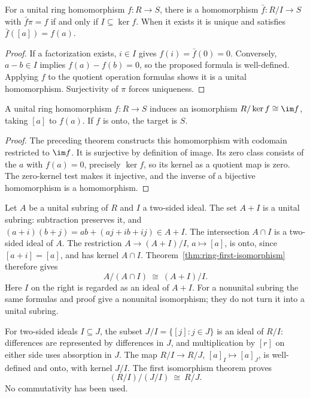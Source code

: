 \begin{theorem}\label{thm:ring-quotient-universal}
For a unital ring homomorphism $f:R\to S$, there is a homomorphism
$\bar f:R/I\to S$ with $\bar f\pi=f$ if and only if $I\subseteq\ker f$.
When it exists it is unique and satisfies $\bar f([a])=f(a)$.
\end{theorem}
\begin{proof}
If a factorization exists, $i\in I$ gives $f(i)=\bar f(0)=0$.
Conversely, $a-b\in I$ implies $f(a)-f(b)=0$, so the proposed formula
is well-defined. Applying $f$ to the quotient operation formulas shows
it is a unital homomorphism. Surjectivity of $\pi$ forces uniqueness.
\end{proof}

\begin{theorem}\label{thm:ring-first-isomorphism}
A unital ring homomorphism $f:R\to S$ induces an isomorphism
$R/\ker f\cong\im f$, taking $[a]$ to $f(a)$. If $f$ is onto,
the target is $S$.
\end{theorem}
\begin{proof}
The preceding theorem constructs this homomorphism with codomain
restricted to $\im f$. It is surjective by definition of image.
Its zero class consists of the $a$ with $f(a)=0$, precisely $\ker f$,
so its kernel as a quotient map is zero. The zero-kernel test makes it
injective, and the inverse of a bijective homomorphism is a homomorphism.
\end{proof}

Let $A$ be a unital subring of $R$ and $I$ a two-sided ideal.
The set $A+I$ is a unital subring: subtraction preserves it, and
$(a+i)(b+j)=ab+(aj+ib+ij)\in A+I$.
The intersection $A\cap I$ is a two-sided ideal of $A$.
The restriction $A\to(A+I)/I$, $a\mapsto[a]$, is onto, since
$[a+i]=[a]$, and has kernel $A\cap I$.
Theorem~\ref{thm:ring-first-isomorphism} therefore gives
\begin{equation}\label{eq:ring-second-iso}
 A/(A\cap I)\ \cong\ (A+I)/I.
\end{equation}
Here $I$ on the right is regarded as an ideal of $A+I$.
For a nonunital subring the same formulas and proof give a nonunital
isomorphism; they do not turn it into a unital subring.

For two-sided ideals $I\subseteq J$, the subset
$J/I=\{[j]:j\in J\}$ is an ideal of $R/I$: differences are represented
by differences in $J$, and multiplication by $[r]$ on either side
uses absorption in $J$. The map $R/I\to R/J$, $[a]_I\mapsto[a]_J$,
is well-defined and onto, with kernel $J/I$.
The first isomorphism theorem proves
\[
 (R/I)/(J/I)\ \cong\ R/J.
\]
No commutativity has been used.

